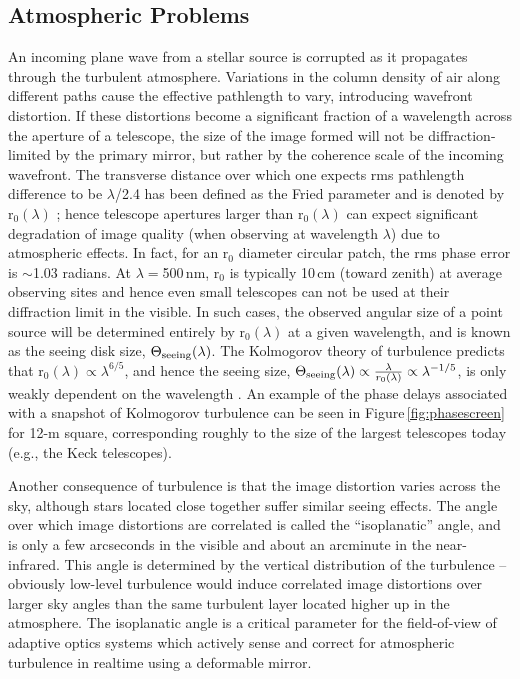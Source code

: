\documentclass[12pt]{iopart}
\begin{document}
\subsection{Atmospheric Problems}
\label{section:seeing}
An incoming plane wave from a stellar source is corrupted as it
propagates through the turbulent atmosphere.  Variations in the column
density of air along different paths cause the effective pathlength to
vary, introducing wavefront distortion.  If these distortions become a
significant fraction of a wavelength across the aperture of a
telescope, the size of the image formed will not be
diffraction-limited by the primary mirror, but rather by the coherence
scale of the incoming wavefront.  The transverse distance over which
one expects rms pathlength difference to be $\lambda$/2.4 has been
defined as the Fried parameter and is denoted by r$_0(\lambda)$
\citep{fried65}; hence telescope apertures larger than r$_0(\lambda)$
can expect significant degradation of image quality (when observing at
wavelength $\lambda$) due to atmospheric effects.  In fact, for an
r$_0$ diameter circular patch, the rms phase error is $\sim$1.03
radians.  At $\lambda=$500\,nm, r$_0$ is typically 10\,cm (toward
zenith) at average observing sites and hence even small telescopes can
not be used at their diffraction limit in the visible.  In such cases,
the observed angular size of a point source will be determined
entirely by r$_0(\lambda)$ at a given wavelength, and is known as the
seeing disk size, $\Theta_{\rm seeing}(\lambda)$.  The Kolmogorov
theory of turbulence \citep{kolmogorov61} predicts that r$_0(\lambda)
\propto \lambda^{6/5}$, and hence the seeing size, $\Theta_{\rm
  seeing}(\lambda) \propto \frac{\lambda}{r_0(\lambda)} \propto
\lambda^{-1/5}$, is only weakly dependent on the wavelength
\citep{fried65}.  An example of the phase delays associated with a
snapshot of Kolmogorov turbulence can be seen in
Figure\,\ref{fig:phasescreen} for 12-m square, corresponding roughly
to the size of the largest telescopes today (e.g., the Keck
telescopes).

Another consequence of turbulence is that the image distortion varies
across the sky, although stars located close together suffer similar
seeing effects.  The angle over which image distortions are correlated
is called the ``isoplanatic'' angle, and is only a few arcseconds in
the visible and about an arcminute in the near-infrared.  This angle
is determined by the vertical distribution of the turbulence --
obviously low-level turbulence would induce correlated image
distortions over larger sky angles than the same turbulent layer
located higher up in the atmosphere. The isoplanatic angle is a
critical parameter for the field-of-view of adaptive optics systems
which actively sense and correct for atmospheric turbulence in
realtime using a deformable mirror.
\end{document}
